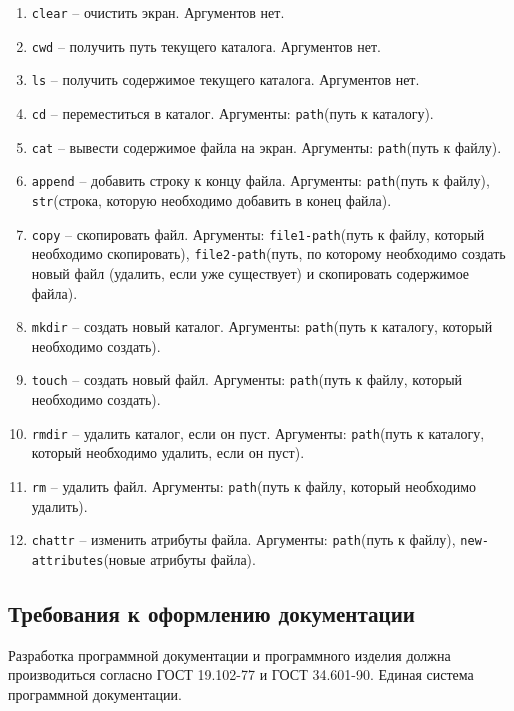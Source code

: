 \begin{enumerate}
\item \texttt{clear} -- очистить экран. Аргументов нет.
\item \texttt{cwd} -- получить путь текущего каталога. Аргументов нет.
\item \texttt{ls} -- получить содержимое текущего каталога. Аргументов нет.
\item \texttt{cd} -- переместиться в каталог. Аргументы: \texttt{path}(путь к каталогу).
\item \texttt{cat} -- вывести содержимое файла на экран. Аргументы: \texttt{path}(путь к файлу).
\item \texttt{append} -- добавить строку к концу файла. Аргументы: \texttt{path}(путь к файлу), \texttt{str}(строка, которую необходимо добавить в конец файла).
\item \texttt{copy} -- скопировать файл. Аргументы: \texttt{file1-path}(путь к файлу, который необходимо скопировать), \texttt{file2-path}(путь, по которому необходимо создать новый файл (удалить, если уже существует) и скопировать содержимое файла).
\item \texttt{mkdir} -- создать новый каталог. Аргументы: \texttt{path}(путь к каталогу, который необходимо создать). 
\item \texttt{touch} -- создать новый файл. Аргументы: \texttt{path}(путь к файлу, который необходимо создать).
\item \texttt{rmdir} -- удалить каталог, если он пуст. Аргументы: \texttt{path}(путь к каталогу, который необходимо удалить, если он пуст).
\item \texttt{rm} -- удалить файл. Аргументы: \texttt{path}(путь к файлу, который необходимо удалить).
\item \texttt{chattr} -- изменить атрибуты файла. Аргументы: \texttt{path}(путь к файлу), \texttt{new-attributes}(новые атрибуты файла).
\end{enumerate}

\subsection{Требования к оформлению документации}

Разработка программной документации и программного изделия должна производиться согласно ГОСТ 19.102-77 и ГОСТ 34.601-90. Единая система программной документации.
